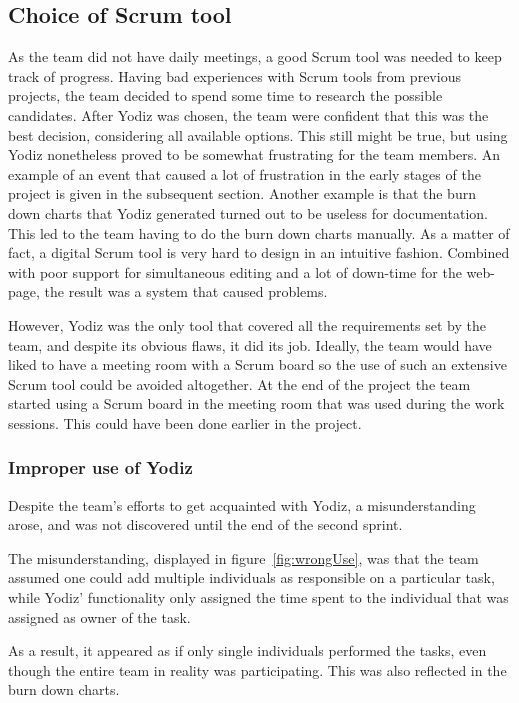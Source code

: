 \subsection{Choice of Scrum tool}
\label{sec:choiceScrumTool}
As the team did not have daily meetings, a good Scrum tool was needed to keep track of progress. Having bad experiences with Scrum tools from previous projects, the team decided to spend some time to research the possible candidates. After Yodiz was chosen, the team were confident that this was the best decision, considering all available options. This still might be true, but using Yodiz nonetheless proved to be somewhat frustrating for the team members. An example of an event that caused a lot of frustration in the early stages of the project is given in the subsequent section. Another example is that the burn down charts that Yodiz generated turned out to be useless for documentation. This led to the team having to do the burn down charts manually. As a matter of fact, a digital Scrum tool is very hard to design in an intuitive fashion. Combined with poor support for simultaneous editing and a lot of down-time for the web-page, the result was a system that caused problems. 

However, Yodiz was the only tool that covered all the requirements set by the team, and despite its obvious flaws, it did its job. Ideally, the team would have liked to have a meeting room with a Scrum board so the use of such an extensive Scrum tool could be avoided altogether. At the end of the project the team started using a Scrum board in the meeting room that was used during the work sessions. This could have been done earlier in the project.


\subsubsection{Improper use of Yodiz}
\label{sec:improperScrum}
Despite the team's efforts to get acquainted with Yodiz, a misunderstanding arose, and was not discovered until the end of the second sprint.

The misunderstanding, displayed in figure~\ref{fig:wrongUse}, was that the team
assumed one could add multiple individuals as responsible on a particular task,
while Yodiz' functionality only assigned the time spent to the individual that was assigned as owner of the task.

As a result, it appeared as if only single individuals performed the tasks,
even though the entire team in reality was participating. This was also
reflected in the burn down charts. 

